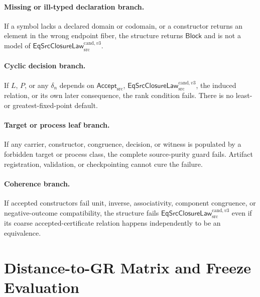 \documentclass[11pt]{article}
\newcommand{\Accept}{\mathsf{Accept}_{\mathrm{src}}}
\newcommand{\Law}{\mathsf{EqSrcClosureLaw}^{\mathrm{cand},v3}_{\mathrm{src}}}
\newcommand{\Block}{\mathsf{Block}}
\begin{document}
\paragraph{Missing or ill-typed declaration branch.}
If a symbol lacks a declared domain or codomain, or a constructor returns an
element in the wrong endpoint fiber, the structure returns \(\Block\) and is
not a model of \(\Law\).

\paragraph{Cyclic decision branch.}
If \(L\), \(P\), or any \(\delta_n\) depends on \(\Accept\), \(\Law\), the
induced relation, or its own later consequence, the rank condition fails.
There is no least- or greatest-fixed-point default.

\paragraph{Target or process leaf branch.}
If any carrier, constructor, congruence, decision, or witness is populated by
a forbidden target or process class, the complete source-purity guard fails.
Artifact registration, validation, or checkpointing cannot cure the failure.

\paragraph{Coherence branch.}
If accepted constructors fail unit, inverse, associativity, component
congruence, or negative-outcome compatibility, the structure fails \(\Law\)
even if its coarse accepted-certificate relation happens independently to be
an equivalence.

\section{Distance-to-GR Matrix and Freeze Evaluation}
\end{document}
